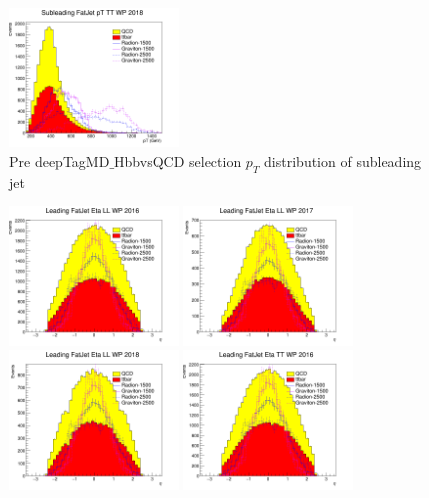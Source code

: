 \begin{figure}[!htb]
	\includegraphics[width=0.4\textwidth]{Figures/pt1TT_18_deepTagMD_HbbvsQCD.png}
	\caption{Pre deepTagMD$\_$HbbvsQCD selection $p_T$ distribution of subleading jet}
	\label{fig:prePtsubBY}
\end{figure}
\begin{figure}[!htb]
	\centering
	\includegraphics[width=0.4\textwidth]{Figures/eta0LL_16_deepTagMD_HbbvsQCD.png}
	\includegraphics[width=0.4\textwidth]{Figures/eta0LL_17_deepTagMD_HbbvsQCD.png}
	\includegraphics[width=0.4\textwidth]{Figures/eta0LL_18_deepTagMD_HbbvsQCD.png}
	\includegraphics[width=0.4\textwidth]{Figures/eta0TT_16_deepTagMD_HbbvsQCD.png}

\end{figure}
